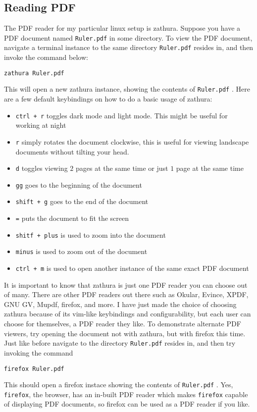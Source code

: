 \documentclass[a4paper, 12pt]{report}
\begin{document}
\begin{center}
\section{Reading PDF}
\begin{comment}
\end{comment}
The PDF reader for my particular linux setup is zathura. Suppose you have a PDF document named \texttt{Ruler.pdf} in some directory. To view the PDF document, navigate a terminal instance to the same directory \texttt{Ruler.pdf} resides in, and then invoke the command below:
\begin{lstlisting}
zathura Ruler.pdf
\end{lstlisting}
This will open a new zathura instance, showing the contents of \texttt{Ruler.pdf} . Here are a few default keybindings on how to do a basic usage of zathura:
\begin{itemize}
\item \texttt{ctrl + r} toggles dark mode and light mode. This might be useful for working at night
\item \texttt{r} simply rotates the document clockwise, this is useful for viewing landscape documents without tilting your head.
\item \texttt{d} toggles viewing $2$ pages at the same time or just $1$ page at the same time
\item \texttt{gg} goes to the beginning of the document
\item \texttt{shift + g} goes to the end of the document
\item \texttt{=} puts the document to fit the screen
\item \texttt{shitf + plus} is used to zoom into the document
\item \texttt{minus} is used to zoom out of the document
\item \texttt{ctrl + m} is used to open another instance of the same exact PDF document
\end{itemize}
It is important to know that zathura is just one PDF reader you can choose out of many. There are other PDF readers out there such as Okular, Evince, XPDF, GNU GV, Mupdf, firefox, and more. I have just made the choice of choosing zathura because of its vim-like keybindings and configurability, but each user can choose for themselves, a PDF reader they like. To demonstrate alternate PDF viewers, try opening the document not with zathura, but with firefox this time. Just like before navigate to the directory \texttt{Ruler.pdf} resides in, and then try invoking the command
\begin{lstlisting}
firefox Ruler.pdf
\end{lstlisting}
This should open a firefox instace showing the contents of \texttt{Ruler.pdf} . Yes, \texttt{firefox}, the browser, has an in-built PDF reader which makes \texttt{firefox} capable of displaying PDF documents, so firefox can be used as a PDF reader if you like.


\end{center}
\end{document}
